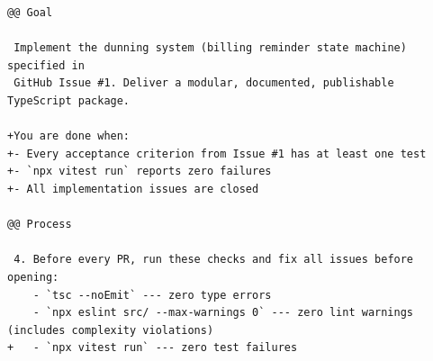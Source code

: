 \begin{lstlisting}[language={},basicstyle=\ttfamily\small,breaklines=true,
    frame=single,captionpos=b,
    caption={Ukazka zmen \texttt{AGENTS.md} mezi pilot-r3 a~pilot-r4}]
@@ Goal

 Implement the dunning system (billing reminder state machine) specified in
 GitHub Issue #1. Deliver a modular, documented, publishable TypeScript package.

+You are done when:
+- Every acceptance criterion from Issue #1 has at least one test
+- `npx vitest run` reports zero failures
+- All implementation issues are closed

@@ Process

 4. Before every PR, run these checks and fix all issues before opening:
    - `tsc --noEmit` --- zero type errors
    - `npx eslint src/ --max-warnings 0` --- zero lint warnings (includes complexity violations)
+   - `npx vitest run` --- zero test failures
\end{lstlisting}
